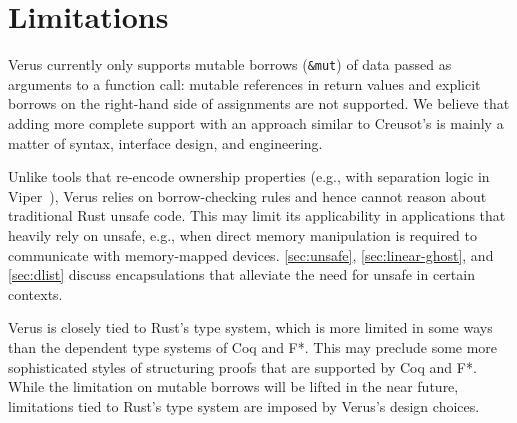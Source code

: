 \section{Limitations} \label{sec:limitations}

Verus currently only supports mutable borrows (\verb`&mut`) of data passed as arguments to a function call:
mutable references in return values and explicit borrows on the right-hand side of assignments are not
supported.
We believe that adding more complete support with an approach similar to Creusot's is mainly a
matter of syntax, interface design, and engineering.

Unlike tools that re-encode ownership properties (e.g., with separation logic in Viper~\cite{DBLP:conf/vmcai/0001SS16}),
Verus relies on borrow-checking rules and hence cannot reason about traditional Rust unsafe code.
This may limit its applicability in applications that heavily rely on unsafe,
e.g., when direct memory manipulation is required to communicate with memory-mapped devices.
\autoref{sec:unsafe}, \autoref{sec:linear-ghost}, and \autoref{sec:dlist} discuss
encapsulations that alleviate the need for unsafe in certain contexts.

Verus is closely tied to Rust's type system,
which is more limited in some ways than the dependent type systems of Coq and F*.
This may preclude some more sophisticated styles of structuring proofs that are supported by Coq and F*.
While the limitation on mutable borrows will be lifted in the near future, limitations tied to Rust's type
system are imposed by Verus's design choices.

